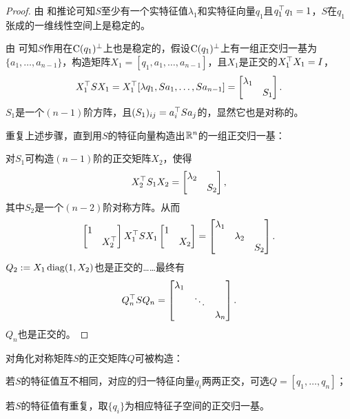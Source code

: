 \begin{proof}
	由 和推论可知$S$至少有一个实特征值$\lambda_1$和实特征向量$q_1$且$q_1^\top q_1 = 1$，$S$在$q_1$张成的一维线性空间上是稳定的。
	
	由 可知$S$作用在$\operatorname{C}(q_1)^\perp$上也是稳定的，假设$\operatorname{C}(q_1)^\perp$上有一组正交归一基为$\{a_1,\ldots,a_{n-1}\}$，构造矩阵$X_1 = [q_1,a_1,\ldots,a_{n-1}]$，且$X_1$是正交的$X_1^\top X_1 = I$，
	\[
		X_1^\top SX_1 = X_1^\top[\lambda q_1,Sa_1,\ldots,Sa_{n-1}] = \begin{bmatrix}
			\lambda_1\\ &S_1
		\end{bmatrix}.
	\]
	$S_1$是一个$(n - 1)$阶方阵，且$(S_1)_{ij} = a_i^\top Sa_j$的，显然它也是对称的。
	
	重复上述步骤，直到用$S$的特征向量构造出$\mathbb{R}^n$的一组正交归一基：
	
	\noindent
	对$S_1$可构造$(n - 1)$阶的正交矩阵$X_2$，使得
	\[
		X_2^\top S_1X_2 = \begin{bmatrix}
			\lambda_2\\ &S_2
		\end{bmatrix},
	\]
	其中$S_2$是一个$(n - 2)$阶对称方阵。从而
	\[
		\begin{bmatrix}
			1\\ &X_2^\top
		\end{bmatrix}X_1^\top SX_1\begin{bmatrix}
			1\\ &X_2
		\end{bmatrix} = \begin{bmatrix}
			\lambda_1\\ &\lambda_2\\ &&S_2
		\end{bmatrix}.
	\]
	$Q_2 := X_1\operatorname{diag}(1, X_2)$也是正交的……最终有
	\begin{equation}\label{eq:la-symmetric-spectral-decomposition}
		Q_n^\top SQ_n = \begin{bmatrix}
			\lambda_1\\ &\ddots\\ &&\lambda_n
		\end{bmatrix}.
	\end{equation}
	$Q_n$也是正交的。
\end{proof}

\begin{remark}
	对角化对称矩阵$S$的正交矩阵$Q$可被构造：
	\begin{compactitem}
		\item 若$S$的特征值互不相同，对应的归一特征向量$q_i$两两正交，可选$Q = [q_1,\ldots,q_n]$；
		\item 若$S$的特征值有重复，取$\{q_i\}$为相应特征子空间的正交归一基。
	\end{compactitem}
\end{remark}

